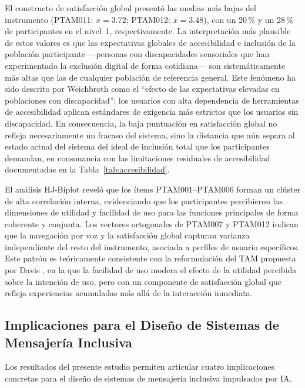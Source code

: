 \documentclass[journal]{IEEEtran}
\begin{document}
			El constructo de satisfacci\'on global present\'o las medias m\'as bajas del instrumento (PTAM011: $\bar{x}=3.72$; PTAM012: $\bar{x}=3.48$), con un 20\,\% y un 28\,\% de participantes en el nivel~1, respectivamente. La interpretaci\'on m\'as plausible de estos valores es que las expectativas globales de accesibilidad e inclusi\'on de la poblaci\'on participante ---personas con discapacidades sensoriales que han experimentado la exclusi\'on digital de forma cotidiana--- son sistemáticamente m\'as altas que las de cualquier poblaci\'on de referencia general. Este fen\'omeno ha sido descrito por Weichbroth \cite{weichbroth2020} como el ``efecto de las expectativas elevadas en poblaciones con discapacidad'': los usuarios con alta dependencia de herramientas de accesibilidad aplican est\'andares de exigencia m\'as estrictos que los usuarios sin discapacidad. En consecuencia, la baja puntuaci\'on en satisfacci\'on global no refleja necesariamente un fracaso del sistema, sino la distancia que a\'un separa al estado actual del sistema del ideal de inclusi\'on total que los participantes demandan, en consonancia con las limitaciones residuales de accesibilidad documentadas en la Tabla~\ref{tab:accesibilidad}.
			
			El an\'alisis HJ-Biplot revel\'o que los \'items PTAM001--PTAM006 forman un cl\'uster de alta correlaci\'on interna, evidenciando que los participantes percibieron las dimensiones de utilidad y facilidad de uso para las funciones principales de forma coherente y conjunta. Los vectores ortogonales de PTAM007 y PTAM012 indican que la navegaci\'on por voz y la satisfacci\'on global capturan varianza independiente del resto del instrumento, asociada a perfiles de usuario espec\'ificos. Este patr\'on es te\'oricamente consistente con la reformulaci\'on del TAM propuesta por Davis \cite{davis1989}, en la que la facilidad de uso modera el efecto de la utilidad percibida sobre la intenci\'on de uso, pero con un componente de satisfacci\'on global que refleja experiencias acumuladas m\'as all\'a de la interacci\'on inmediata.
			
		\subsection{Implicaciones para el Dise\~no de Sistemas de Mensajer\'ia Inclusiva}
			Los resultados del presente estudio permiten articular cuatro implicaciones concretas para el dise\~no de sistemas de mensajer\'ia inclusiva impulsados por IA.
			
\end{document}
